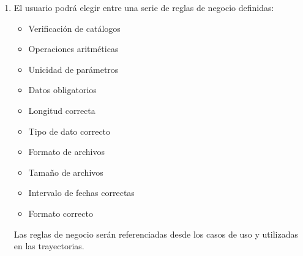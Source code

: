 \begin{enumerate}[{\bf RF01.}]
 \item El usuario podrá elegir entre una serie de reglas de negocio definidas:
	\begin{itemize}
		\item Verificación de catálogos
		\item Operaciones aritméticas
		\item Unicidad de parámetros
		\item Datos obligatorios
		\item Longitud correcta
		\item Tipo de dato correcto
		\item Formato de archivos
		\item Tamaño de archivos
		\item Intervalo de fechas correctas
		\item Formato correcto
	\end{itemize}
	Las reglas de negocio serán referenciadas desde los casos de uso y utilizadas en las trayectorias.
\end{enumerate}



